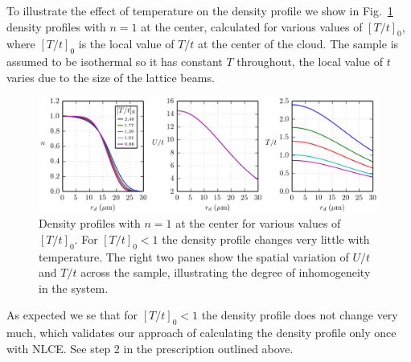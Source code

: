 \documentclass[11pt,letter]{article}
\begin{document}
To illustrate the effect of temperature on the density profile we show in
Fig.~\ref{fig:dens_varyT}  density profiles with $n=1$ at the center,
calculated for various values of $[T/t]_{0}$,  where $[T/t]_{0}$ is the local
value of $T/t$ at the center of the cloud.  The sample is assumed to be
isothermal so it has constant $T$ throughout, the local value of $t$ varies due
to the size of the lattice beams.
\begin{figure}
    \centering
\includegraphics[width=\textwidth]{../dataplots/Basic00/density_varyT.png}
\caption{Density profiles with $n=1$ at the center for various values of
$[T/t]_{0}$. For $[T/t]_{0}<1$ the density profile changes very little with
temperature.  The right two panes show the spatial variation of $U/t$ and $T/t$
across the sample, illustrating the degree of inhomogeneity in the system. }
\label{fig:dens_varyT}
\end{figure}
As expected we se that for $[T/t]_{0} < 1 $ the density profile does not change
very much, which validates our approach of calculating the density profile only
once with NLCE.  See step 2 in the prescription outlined above.

 


 
 

 
 
\end{document}
